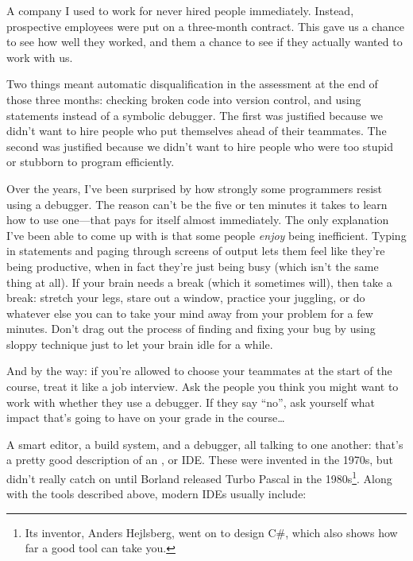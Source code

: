 \documentclass{report}
\begin{document}
A company I used to work for never hired people immediately.  Instead,
prospective employees were put on a three-month contract.  This gave
us a chance to see how well they worked, and them a chance to see if
they actually wanted to work with us.

Two things meant automatic disqualification in the assessment at the
end of those three months: checking broken code into version control,
and using  statements instead of a symbolic debugger.  The
first was justified because we didn't want to hire people who put
themselves ahead of their teammates.  The second was justified because
we didn't want to hire people who were too stupid or stubborn to
program efficiently.

Over the years, I've been surprised by how strongly some programmers
resist using a debugger.  The reason can't be the five or ten minutes
it takes to learn how to use one---that pays for itself almost
immediately.  The only explanation I've been able to come up with is
that some people \emph{enjoy} being inefficient.  Typing in
 statements and paging through screens of output lets them
feel like they're being productive, when in fact they're just being
busy (which isn't the same thing at all).  If your brain needs a break
(which it sometimes will), then take a break: stretch your legs, stare
out a window, practice your juggling, or do whatever else you can to
take your mind away from your problem for a few minutes.  Don't drag
out the process of finding and fixing your bug by using sloppy
technique just to let your brain idle for a while.

And by the way: if you're allowed to choose your teammates at the
start of the course, treat it like a job interview.  Ask the people
you think you might want to work with whether they use a debugger.  If
they say ``no'', ask yourself what impact that's going to have on your
grade in the course{\ldots}


A smart editor, a build system, and a debugger, all talking to one
another: that's a pretty good description of an , or IDE.  These were invented in the 1970s,
but didn't really catch on until Borland released Turbo Pascal in the
1980s\footnote{Its inventor, Anders Hejlsberg, went on to design C\#,
which also shows how far a good tool can take you.}.  Along with the
tools described above, modern IDEs usually include:
\end{document}
